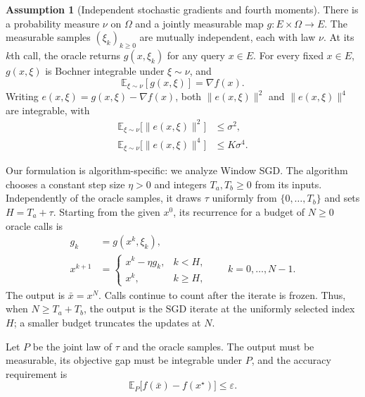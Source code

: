 \documentclass[10pt]{article}
\theoremstyle{definition}
\newtheorem{assumption}{Assumption}
\begin{document}
\begin{assumption}[Independent stochastic gradients and fourth moments]
There is a probability measure $\nu$ on $\Omega$ and a jointly measurable map $g:E\times\Omega\to E$. The measurable samples $(\xi_k)_{k\geq0}$ are mutually independent, each with law $\nu$. At its $k$th call, the oracle returns $g(x,\xi_k)$ for any query $x\in E$.
For every fixed $x\in E$, $g(x,\xi)$ is Bochner integrable under $\xi\sim\nu$, and
\[
\mathbb{E}_{\xi\sim\nu}[g(x,\xi)]=\nabla f(x).
\]
Writing $e(x,\xi)=g(x,\xi)-\nabla f(x)$, both $\|e(x,\xi)\|^2$ and $\|e(x,\xi)\|^4$ are integrable, with
\[
\begin{aligned}
\mathbb{E}_{\xi\sim\nu}\bigl[\|e(x,\xi)\|^2\bigr]&\leq\sigma^2,\\
\mathbb{E}_{\xi\sim\nu}\bigl[\|e(x,\xi)\|^4\bigr]&\leq K\sigma^4.
\end{aligned}
\]
\end{assumption}

Our formulation is algorithm-specific: we analyze Window SGD. The algorithm chooses a constant step size $\eta>0$ and integers $T_a,T_b\geq0$ from its inputs. Independently of the oracle samples, it draws $\tau$ uniformly from $\{0,\ldots,T_b\}$ and sets $H=T_a+\tau$. Starting from the given $x^0$, its recurrence for a budget of $N\geq0$ oracle calls is
\[
\begin{aligned}
g_k&=g(x^k,\xi_k),\\
x^{k+1}&=
\begin{cases}
x^k-\eta g_k,&k<H,\\
x^k,&k\geq H,
\end{cases}
\qquad k=0,\ldots,N-1.
\end{aligned}
\]
The output is $\bar{x}=x^N$. Calls continue to count after the iterate is frozen. Thus, when $N\geq T_a+T_b$, the output is the SGD iterate at the uniformly selected index $H$; a smaller budget truncates the updates at $N$.

Let $P$ be the joint law of $\tau$ and the oracle samples. The output must be measurable, its objective gap must be integrable under $P$, and the accuracy requirement is
\[
\mathbb{E}_{P}\bigl[f(\bar{x})-f(x^\star)\bigr]\leq\varepsilon.
\]
\end{document}
